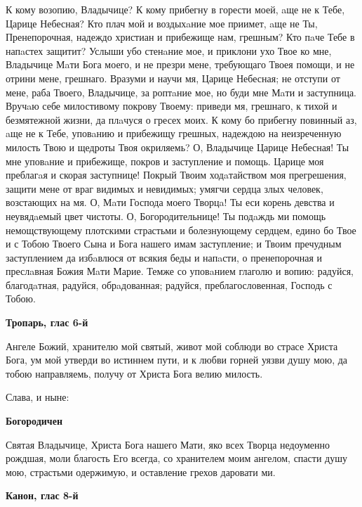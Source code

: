 К кому возопию, Владычице? К кому прибегну в горести моей, aще не к Тебе, Царице Небесная? Кто плач мой и воздыхaние мое приимет, aще не Ты, Пренепорочная, надеждо христиан и прибежище нам, грешным? Кто пaче Тебе в напaстех защитит? Услыши убо стенaние мое, и приклони ухо Твое ко мне, Владычице Мaти Бога моего, и не презри мене, требующаго Твоея помощи, и не отрини мене, грешнаго. Вразуми и научи мя, Царице Небесная; не отступи от мене, раба Твоего, Владычице, за роптaние мое, но буди мне Мaти и заступница. Вручaю себе милостивому покрову Твоему: приведи мя, грешнаго, к тихой и безмятежной жизни, да плaчуся о гресех моих. К кому бо прибегну повинный аз, aще не к Тебе, уповaнию и прибежищу грешных, надеждою на неизреченную милость Твою и щедроты Твоя окриляемь? О, Владычице Царице Небесная! Ты мне уповaние и прибежище, покров и заступление и помощь. Царице моя преблагaя и скорая заступнице! Покрый Твоим ходaтайством моя прегрешения, защити мене от враг видимых и невидимых; умягчи сердца злых человек, возстающих на мя. О, Мaти Господа моего Творцa! Ты еси корень девства и неувядaемый цвет чистоты. О, Богородительнице! Ты подaждь ми помощь немощствующему плотскими страстьми и болезнующему сердцем, едино бо Твое и с Тобою Твоего Сына и Бога нашего имам заступление; и Твоим пречудным заступлением да избaвлюся от всякия беды и напaсти, о пренепорочная и преслaвная Божия Мaти Марие. Темже со уповaнием глаголю и вопию: радуйся, благодaтная, радуйся, обрaдованная; радуйся, преблагословенная, Господь с Тобою.

\mychapterending

 

\bfseries Тропарь, глас 6-й


\normalfont{}Ангеле Божий, хранителю мой святый, живот мой соблюди во страсе Христа Бога, ум мой утверди во истиннем пути, и к любви горней уязви душу мою, да тобою направляемь, получу от Христа Бога велию милость.


Слава, и ныне:

\medskip
\bfseries Богородичен


\normalfont{}Святая Владычице, Христа Бога нашего Мати, яко всех Творца недоуменно рождшая, моли благость Его всегда, со хранителем моим ангелом, спасти душу мою, страстьми одержимую, и оставление грехов даровати ми.


\medskip
\bfseries Канон, глас 8-й\normalfont{}


